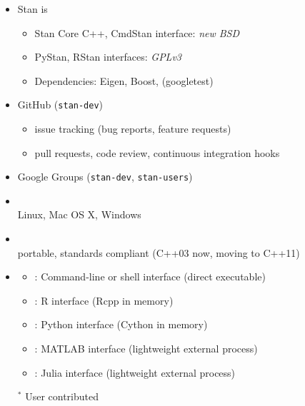 \documentclass[10pt]{report}
\newcommand{\sld}[1]{\newpage{\noindent\LARGE \ \ \
    \textcolor{MidnightBlue}{\bfseries #1}}\vspace*{4pt}}
\newcommand{\myemph}[1]{{\color{MidnightBlue}{\bfseries #1}}}
\begin{document}
\begin{itemize}
\item Stan is \myemph{open source}
\vspace*{-4pt}
\begin{itemize} 
\small
\item Stan Core C++, CmdStan interface: {\slshape new BSD}
\item PyStan, RStan interfaces: {\slshape GPLv3}
\item Dependencies: Eigen, Boost, (googletest)
\end{itemize}
\item GitHub \myemph{hosted publicly} {\small ({\tt stan-dev})}
\vspace*{-4pt}
\begin{itemize}
\small
\item issue tracking (bug reports, feature requests)
\item pull requests, code review, continuous integration hooks
\end{itemize}
\item Google Groups \myemph{public mailing lists} {\small ({\tt stan-dev}, {\tt stan-users})}
\end{itemize}

\sld{Platforms and Interfaces}

\begin{itemize}
\item \myemph{Platforms}
\\
Linux, Mac OS X, Windows
\item \myemph{C++ API}
\\
{\footnotesize portable, standards compliant (C++03 now, moving to C++11)}
\item \myemph{Interfaces}
\vspace*{-4pt}
\begin{itemize}\footnotesize
\item \myemph{CmdStan}: Command-line or shell interface (direct executable)
\item \myemph{RStan}: R interface (Rcpp in memory)
\item \myemph{PyStan}: Python interface (Cython in memory)
\item \myemph{MStan$^*$}: MATLAB interface (lightweight external process)
\item \myemph{JuliaStan$^*$}: Julia interface (lightweight external process)
\end{itemize}
{\footnotesize ${}^*$ User contributed}
\end{itemize}
\vfill
\end{document}
